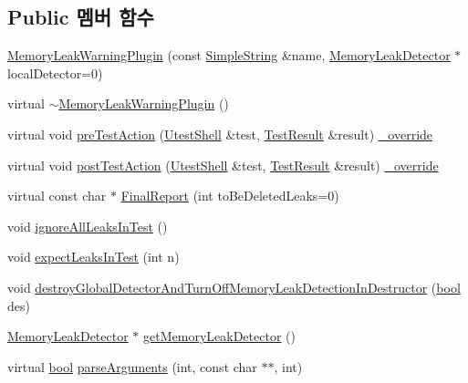 \subsection*{Public 멤버 함수}
\begin{DoxyCompactItemize}
\item 
\hyperlink{class_memory_leak_warning_plugin_acb8705c4679955decb1c23e4b179d80d}{Memory\+Leak\+Warning\+Plugin} (const \hyperlink{class_simple_string}{Simple\+String} \&name, \hyperlink{class_memory_leak_detector}{Memory\+Leak\+Detector} $\ast$local\+Detector=0)
\item 
virtual \hyperlink{class_memory_leak_warning_plugin_af348e301709dc8a19affa200d1406056}{$\sim$\+Memory\+Leak\+Warning\+Plugin} ()
\item 
virtual void \hyperlink{class_memory_leak_warning_plugin_af405f9e83b5fbe382893b8dc07a8052c}{pre\+Test\+Action} (\hyperlink{class_utest_shell}{Utest\+Shell} \&test, \hyperlink{class_test_result}{Test\+Result} \&result) \hyperlink{_cpp_u_test_config_8h_a049bea15dd750e15869863c94c1efc3b}{\+\_\+override}
\item 
virtual void \hyperlink{class_memory_leak_warning_plugin_a488f8809f966fc52513ee74afa87cda3}{post\+Test\+Action} (\hyperlink{class_utest_shell}{Utest\+Shell} \&test, \hyperlink{class_test_result}{Test\+Result} \&result) \hyperlink{_cpp_u_test_config_8h_a049bea15dd750e15869863c94c1efc3b}{\+\_\+override}
\item 
virtual const char $\ast$ \hyperlink{class_memory_leak_warning_plugin_a421735183ea6221a87c52f9899ec7fe2}{Final\+Report} (int to\+Be\+Deleted\+Leaks=0)
\item 
void \hyperlink{class_memory_leak_warning_plugin_a5cb2ea1859ddd7ef88ff4bef5bc8fc9e}{ignore\+All\+Leaks\+In\+Test} ()
\item 
void \hyperlink{class_memory_leak_warning_plugin_a4f96d3d171513bcd45d754719e13a298}{expect\+Leaks\+In\+Test} (int n)
\item 
void \hyperlink{class_memory_leak_warning_plugin_a5768cf1dca1692f7cb326a59dd7fd829}{destroy\+Global\+Detector\+And\+Turn\+Off\+Memory\+Leak\+Detection\+In\+Destructor} (\hyperlink{avb__gptp_8h_af6a258d8f3ee5206d682d799316314b1}{bool} des)
\item 
\hyperlink{class_memory_leak_detector}{Memory\+Leak\+Detector} $\ast$ \hyperlink{class_memory_leak_warning_plugin_a6bb3f30258a2552981351e485100bc04}{get\+Memory\+Leak\+Detector} ()
\item 
virtual \hyperlink{avb__gptp_8h_af6a258d8f3ee5206d682d799316314b1}{bool} \hyperlink{class_test_plugin_a167c2b07a0f83726bb9b1d1c0d741f88}{parse\+Arguments} (int, const char $\ast$$\ast$, int)
$$
\end{DoxyCompactItemize}
